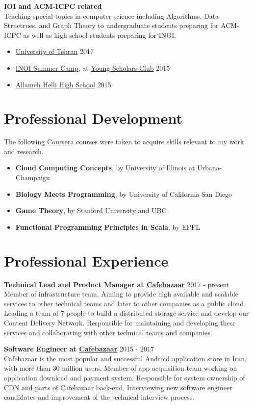 \documentclass[margin]{res}
\begin{document}
\begin{resume}
    {\bf IOI and ACM-ICPC related}
    \\Teaching special topics in computer science including Algorithms, Data Structrues,
    and Graph Theory to undergraduate students preparing for ACM-ICPC as well as high school
    students preparing for INOI.
    \begin{itemize}
		\item \href{http://ut.ac.ir/en}{University of Tehran} \hfill 2017
		\item \href{http://inoi.ir/}{INOI Summer Camp}, at \href{http://ysc.ac.ir/}{Young Scholars Club} \hfill 2015
	    \item \href{http://www.helli.ir/}{Allameh Helli High School} \hfill 2015
	\end{itemize}

\section{Professional Development}
	The following \href{https://www.coursera.org/}{Coursera} courses were taken to acquire skills relevant to my work and research.
	\begin{itemize}
		\item {\bf Cloud Computing Concepts}, by University of Illinois at Urbana-Champaign
		\item {\bf Biology Meets Programming}, by University of California San Diego
		\item {\bf Game Theory}, by Stanford University and UBC
		\item {\bf Functional Programming Principles in Scala}, by EPFL
	\end{itemize}

\section{Professional Experience}
	{\bf Technical Lead and Product Manager at \href{https://cafebazaar.ir/}{Cafebazaar}} \hfill 2017 - present
	\\ Member of infrastructure team. Aiming to provide high available and scalable services to other technical teams and later to other companies as a public cloud. Leading a team of 7 people to build a distributed storage service and develop our Content Delivery Network. Responsible for maintaining and developing these services and collaborating with other technical teams and companies.

	{\bf Software Engineer at \href{https://cafebazaar.ir/}{Cafebazaar}} \hfill 2015 - 2017
	\\ Cafebazaar is the most popular and successful Android application store in Iran, with more than 30 million users. Member of app acquisition team working on application download and payment system. Responsible for system ownership of CDN and parts of Cafebazaar back-end, Interviewing new software engineer candidates and improvement of the technical interview process.


\end{resume}
\end{document}
